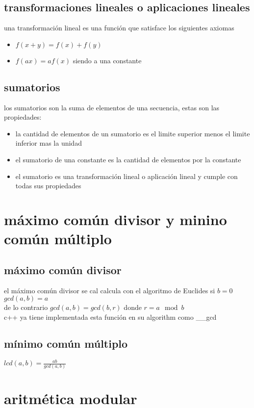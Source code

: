 \documentclass[11pt,a4paper]{book}
\begin{document}
\subsection{transformaciones lineales o aplicaciones lineales}
una transformación lineal es una función que satisface los siguientes axiomas
\begin{itemize}
\item $f(x+y)=f(x)+f(y)$ 
\item $f(ax)=af(x)$ siendo a una constante
\end{itemize} 

\subsection{sumatorios}
los sumatorios son la suma de elementos de una secuencia, estas son las propiedades:
\begin{itemize}
\item la cantidad de elementos de un sumatorio es el limite superior menos el limite inferior mas la unidad 
\item el sumatorio de una constante es la cantidad de elementos por la constante
\item el sumatorio es una transformación lineal o aplicación lineal y cumple con todas sus propiedades
\end{itemize}

\section{máximo común divisor y minino común múltiplo}
\subsection{máximo común divisor}
el máximo común divisor se cal calcula con el algoritmo de Euclides
si $b=0$  $gcd(a,b)=a$\\
de lo contrario $ gcd(a,b)=gcd(b,r)$ donde $r=a \mod{b}$\\
c++ ya tiene implementada esta función en su  algorithm como \_\_gcd 

\subsection{mínimo común múltiplo}
$lcd(a,b)=\frac{ab}{gcd(a,b)}$


\section{aritmética modular}
\end{document}
